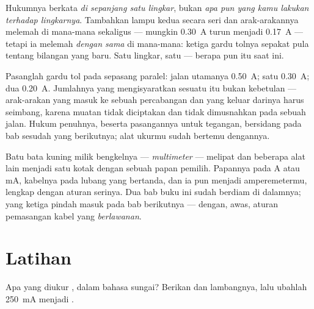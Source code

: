 \begin{example}\label{ex:g8:intensity-ammeter:fineprint}
Hukumnya berkata \emph{di sepanjang satu lingkar}, bukan \emph{apa pun
yang kamu lakukan terhadap lingkarnya}. Tambahkan lampu kedua secara
seri dan arak-arakannya melemah di mana-mana sekaligus --- mungkin
\qty{0.30}{A} turun menjadi \qty{0.17}{A} --- tetapi ia melemah
\emph{dengan sama} di mana-mana: ketiga gardu tolnya sepakat pula
tentang bilangan yang baru. Satu lingkar, satu  --- berapa pun
 itu saat ini.
\end{example}

\begin{example}\label{ex:g8:intensity-ammeter:junction}
Pasanglah gardu tol pada sepasang  paralel: jalan utamanya
\qty{0.50}{A};  satu \qty{0.30}{A};  dua
\qty{0.20}{A}. Jumlahnya yang mengisyaratkan sesuatu itu bukan
kebetulan --- arak-arakan yang masuk ke sebuah percabangan dan yang
keluar darinya harus seimbang, karena muatan tidak diciptakan dan
tidak dimusnahkan pada sebuah  jalan. Hukum penuhnya, beserta
pasangannya untuk tegangan, bersidang pada bab sesudah yang berikutnya;
alat ukurmu sudah bertemu dengannya.
\end{example}

\begin{remark}[Multimeternya]\label{rem:g8:intensity-ammeter:multimeter}
Batu bata kuning milik bengkelnya --- \emph{multimeter} --- melipat
 dan beberapa alat lain menjadi satu kotak dengan sebuah
papan pemilih. Papannya pada \unit{A} atau \unit{mA}, kabelnya pada
lubang yang bertanda, dan ia pun menjadi amperemetermu, lengkap dengan
aturan serinya. Dua bab buku ini sudah berdiam di dalamnya; yang
ketiga pindah masuk pada bab berikutnya --- dengan, awas, aturan
pemasangan kabel yang \emph{berlawanan}.
\end{remark}

\section{Latihan}

\begin{exercise}[$\star$]\label{exo:g8:intensity-ammeter:1}
Apa yang diukur , dalam bahasa sungai? Berikan  dan
lambangnya, lalu ubahlah \qty{250}{mA} menjadi .
\end{exercise}

